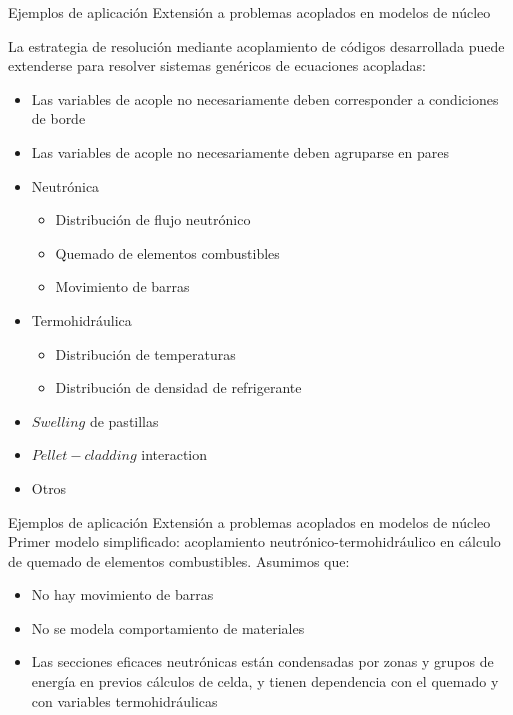 \begin{frame}
{Ejemplos de aplicación}
{Extensión a problemas acoplados en modelos de núcleo}

La estrategia de resolución mediante acoplamiento de códigos desarrollada puede extenderse para resolver sistemas genéricos de ecuaciones acopladas:
\begin{itemize}
  \item <2-> Las variables de acople no necesariamente deben corresponder a condiciones de borde
  \item <3-> Las variables de acople no necesariamente deben agruparse en pares
\end{itemize}
\begin{itemize}
  \item <5-> Neutrónica
    \begin{itemize}
    \item Distribución de flujo neutrónico
    \item Quemado de elementos combustibles
    \item Movimiento de barras
    \end{itemize}
  \item <6-> Termohidráulica
    \begin{itemize}
    \item Distribución de temperaturas
    \item Distribución de densidad de refrigerante
    \end{itemize}
  \item <7-> $Swelling$ de pastillas %
  \item <8-> $Pellet-cladding$ interaction %
  \item <9-> Otros
\end{itemize}

\end{frame}


\begin{frame}
{Ejemplos de aplicación}
{Extensión a problemas acoplados en modelos de núcleo}
Primer modelo simplificado:
acoplamiento neutrónico-termohidráulico en cálculo de quemado de elementos combustibles.
Asumimos que:
  \begin{itemize}
    \item <2-> No hay movimiento de barras
    \item <3-> No se modela comportamiento de materiales
    \item <4-> Las secciones eficaces neutrónicas están condensadas por zonas y grupos de energía en previos cálculos de celda, y tienen dependencia con el quemado y con variables termohidráulicas
   \end{itemize}

\end{frame}



